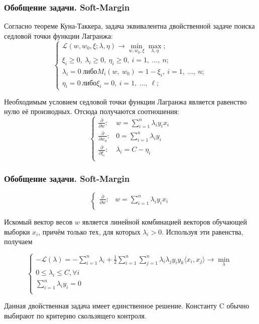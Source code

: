 \documentclass[11pt]{beamer}
\begin{document}
\begin{frame}
	\frametitle{Обобщение задачи. Soft-Margin}
	Согласно теореме Куна-Таккера, задача эквивалентна двойственной задаче поиска седловой точки функции Лагранжа:
	$$
	\begin{cases}
		\mathcal{L}(w, w_{0}, \xi;\lambda,\eta)\rightarrow \underset{w,w_{0},\xi} \min  \underset{\lambda,\eta} \max; \\
		\xi_{i}\geq 0,\ \lambda_{i}\geq 0,\ \eta_{i}\geq 0,\ i=1,\ \ldots,\ n;\\
		\lambda_{i}=0\ либо M_{i}(w,\ w_{0})=1-\xi_{i},\ i=1,\ \ldots,\ n;\\
		\eta_{i}=0\ либо \xi_{i}=0,\ i=1,\ \ldots,\ \ell;
	\end{cases}
	$$
	
	Необходимым условием седловой точки функции Лагранжа является
	равенство нулю её производных. Отсюда получаются соотношения:
	$$
	\begin{cases}
		\frac{\partial}{\partial w}: & w = \sum\limits_{i=1}^{n}\lambda_i y_i x_i \\
		\frac{\partial}{\partial w_0}: & 0=\sum\limits_{i=1}^{n}\lambda_i y_i \\
		\frac{\partial}{\partial \xi_i}: & \lambda_i=C-\eta_i \\
	\end{cases}
	$$
	
\end{frame}


\begin{frame}
	\frametitle{Обобщение задачи. Soft-Margin}
	$$
	\begin{cases}
		\frac{\partial}{\partial w}: & w = \sum\limits_{i=1}^{n}\lambda_i y_i x_i \\
	\end{cases}
	$$
	
	Искомый вектор весов $w$ является линейной комбинацией векторов обучающей выборки $x_i$, причём только тех, для которых $\lambda_i > 0$. Используя эти равенства, получаем
	
		$$
	\begin{cases}
		-\mathcal{L}(\lambda)=-\sum\limits_{i=1}^n\lambda_i+\frac{1}{2}\sum\limits_{i=1}^{n}\sum\limits_{j=1}^{n}\lambda_i\lambda_j y_i y_k \langle x_i,  x_j \rangle \rightarrow \min\limits_{\lambda} \\
		0 \leq \lambda_i \leq C, \forall i \\
		\sum\limits_{i=1}^{n}\lambda_i y_i=0 \\
	\end{cases}
	$$
	
	Данная двойственная задача имеет единственное решение. Константу C обычно выбирают по критерию скользящего контроля.
\end{frame}
\end{document}
